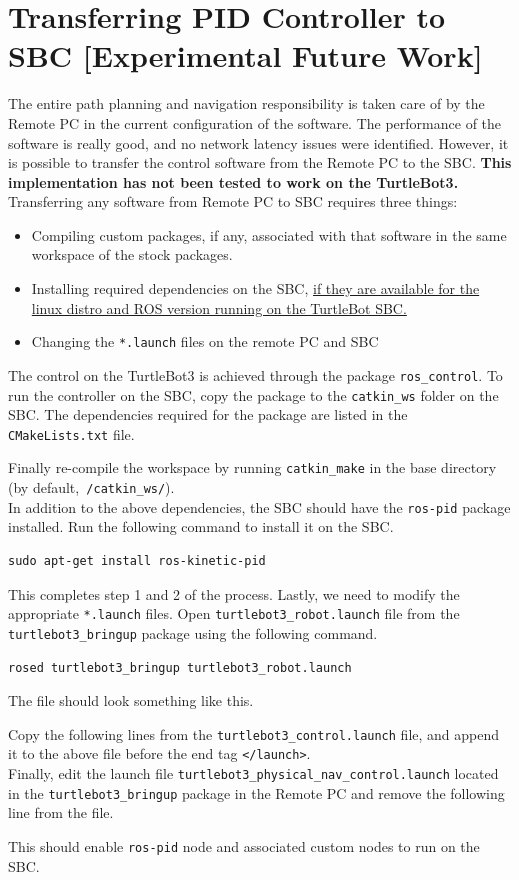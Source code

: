 \documentclass[12]{article}
\begin{document}
\section{Transferring PID Controller to SBC [Experimental Future Work]}
The entire path planning and navigation responsibility is taken care of by the Remote PC in the current configuration of the software. The performance of the software is really good, and no network latency issues were identified. However, it is possible to transfer the control software from the Remote PC to the SBC. \textbf{This implementation has not been tested to work on the TurtleBot3.} Transferring any software from Remote PC to SBC requires three things:
\begin{itemize}
	\item{Compiling custom packages, if any, associated with that software in the same workspace of the stock packages.}	
	\item{Installing required dependencies on the SBC, \ul{if they are available for the linux distro and ROS version running on the TurtleBot SBC.}}
	\item{Changing the \texttt{*.launch} files on the remote PC and SBC}
\end{itemize}
The control on the TurtleBot3 is achieved through the package \texttt{ros\_control}. To run the controller on the SBC, copy the package to the \texttt{catkin\_ws} folder on the SBC. The dependencies required for the package are listed  in the \texttt{CMakeLists.txt} file.

Finally re-compile the workspace by running \texttt{catkin\_make} in the base directory (by default,\texttt{~/catkin\_ws/}).\\
In addition to the above dependencies, the SBC should have the \texttt{ros-pid} package installed. Run the following command to install it on the SBC.
\begin{lstlisting}[style=bash]
sudo apt-get install ros-kinetic-pid
\end{lstlisting}
This completes step 1 and 2 of the process. Lastly, we need to modify the appropriate \texttt{*.launch} files. Open \texttt{turtlebot3\_robot.launch} file from the \texttt{turtlebot3\_bringup} package using the following command.
\begin{lstlisting}[style=bash]
rosed turtlebot3_bringup turtlebot3_robot.launch
\end{lstlisting}
The file should look something like this.

Copy the following lines from the \texttt{turtlebot3\_control.launch} file, and append it to the above file before the end tag \texttt{</launch>}.\\

Finally, edit the launch file \texttt{turtlebot3\_physical\_nav\_control.launch} located in the \texttt{turtlebot3\_bringup} package in the Remote PC and remove the following line from the file.

This should enable \texttt{ros-pid} node and associated custom nodes to run on the SBC.
\end{document}
